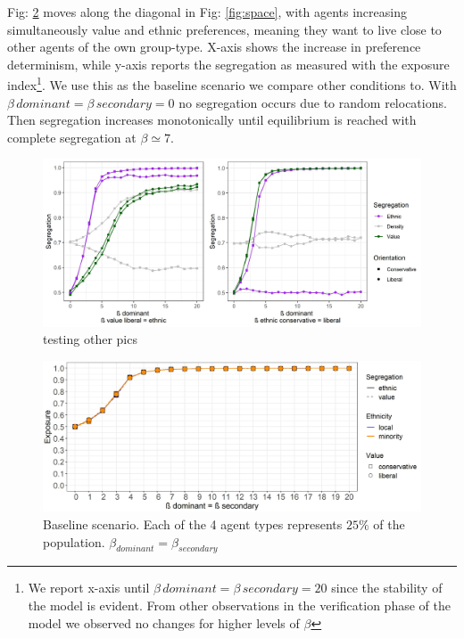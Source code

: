 \documentclass{article}
\begin{document}
Fig: \ref{fig:baseline} moves along the diagonal in Fig: \ref{fig:space}, with agents increasing simultaneously value and ethnic preferences, meaning they want to live close to other agents of the own group-type. X-axis shows the increase in preference determinism, while y-axis reports the segregation as measured with the exposure index\footnote{We report x-axis until $\beta \, dominant = \beta \, secondary = 20$ since the stability of the model is evident. From other observations in the verification phase of the model we observed no changes for higher levels of $\beta$}. We use this as the baseline scenario we compare other conditions to. %
With $\beta \, dominant = \beta \, secondary = 0$ no segregation occurs due to random  relocations. Then segregation increases monotonically until equilibrium is reached with complete segregation at $\beta \simeq 7$. 

\begin{figure}[H]
  \centering
\includegraphics[scale=0.6]{material/figures/Bsl_eth_lib.jpg}
    \caption{testing other pics}
    \label{fig:testing pics}
\end{figure} %


\begin{figure}[H]
    \centering
    \includegraphics[scale=0.5]{material/figures/one_beta.jpg}
    \caption{Baseline scenario. Each of the 4 agent types represents $25 \%$ of the population. $\beta_{dominant} = \beta_{secondary}$}
    \label{fig:baseline}
\end{figure} %
 
\end{document}
